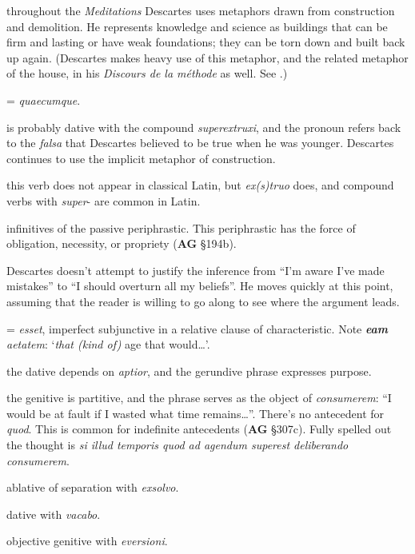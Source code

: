  throughout the \textit{Meditations} Descartes uses metaphors drawn from construction and demolition. He represents knowledge and science as buildings that can be firm and lasting or have weak foundations; they can be torn down and built back up again. (Descartes makes heavy use of this metaphor, and the related metaphor of the house, in his \textit{Discours de la méthode} as well. See \citet[22]{curtis1984}.)

 = \textit{quaecumque}.

 is probably dative with the compound \textit{superextruxi}, and the pronoun refers back to the \textit{falsa} that Descartes believed to be true when he was younger. Descartes continues to use the implicit metaphor of construction.

 this verb does not appear in classical Latin, but \textit{ex(s)truo} does, and compound verbs with \textit{super}- are common in Latin.

 infinitives of the passive periphrastic. This periphrastic has the force of obligation, necessity, or propriety (\textbf{AG} §194b).

 Descartes doesn't attempt to justify the inference from ``I'm aware I've made mistakes'' to ``I should overturn all my beliefs''. He moves quickly at this point, assuming that the reader is willing to go along to see where the argument leads. 

 = \textit{esset}, imperfect subjunctive in a relative clause of characteristic. Note \textit{\textbf{eam} aetatem}: `\textit{that (kind of)} age that would\dots'.

 the dative depends on \textit{aptior}, and the gerundive phrase expresses purpose.

 the genitive is partitive, and the phrase serves as the object of \textit{consumerem}: ``I would be at fault if I wasted what time remains\dots''. There's no antecedent for \textit{quod}. This is common for indefinite antecedents (\textbf{AG} §307c). Fully spelled out the thought is \textit{si illud temporis quod ad agendum superest deliberando consumerem}.

 ablative of separation with \textit{exsolvo}.

 dative with \textit{vacabo}.

 objective genitive with \textit{eversioni}.

